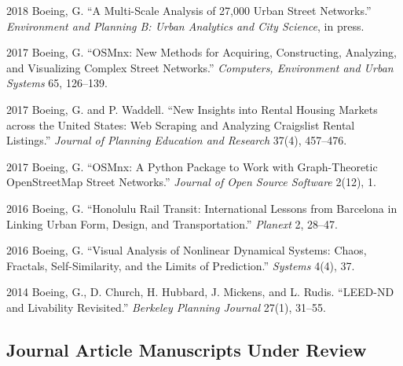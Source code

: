 \documentclass{academiccv}
\begin{document}
\begin{tablist}
	
\item[2018] \tab Boeing, G. \enquote{A Multi-Scale Analysis of 27,000 Urban Street Networks.} \textit{Environment and Planning B: Urban Analytics and City Science}, in press.

\item[2017] \tab Boeing, G. \enquote{OSMnx: New Methods for Acquiring, Constructing, Analyzing, and Visualizing Complex Street Networks.} \textit{Computers, Environment and Urban Systems} 65, 126--139.

\item[2017] \tab Boeing, G. and P. Waddell. \enquote{New Insights into Rental Housing Markets across the United States: Web Scraping and Analyzing Craigslist Rental Listings.} \textit{Journal of Planning Education and Research} 37(4), 457--476.

\item[2017] \tab Boeing, G. \enquote{OSMnx: A Python Package to Work with Graph-Theoretic OpenStreetMap Street Networks.} \textit{Journal of Open Source Software} 2(12), 1.

\item[2016] \tab Boeing, G. \enquote{Honolulu Rail Transit: International Lessons from Barcelona in Linking Urban Form, Design, and Transportation.} \textit{Planext} 2, 28--47.

\item[2016] \tab Boeing, G. \enquote{Visual Analysis of Nonlinear Dynamical Systems: Chaos, Fractals, Self-Similarity, and the Limits of Prediction.} \textit{Systems} 4(4), 37.

\item[2014] \tab Boeing, G., D. Church, H. Hubbard, J. Mickens, and L. Rudis. \enquote{LEED-ND and Livability Revisited.} \textit{Berkeley Planning Journal} 27(1), 31--55.

\end{tablist}



\subsection*{Journal Article Manuscripts Under Review}
\end{document}
